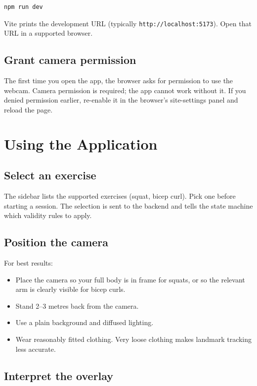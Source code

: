 \documentclass{article}
\begin{document}
\begin{verbatim}
npm run dev
\end{verbatim}

Vite prints the development URL (typically
\texttt{http://localhost:5173}). Open that URL in a supported browser.

\subsection{Grant camera permission}

The first time you open the app, the browser asks for permission to
use the webcam. Camera permission is required; the app cannot work
without it. If you denied permission earlier, re-enable it in the
browser's site-settings panel and reload the page.

\section{Using the Application}

\subsection{Select an exercise}

The sidebar lists the supported exercises (squat, bicep curl). Pick
one before starting a session. The selection is sent to the backend
and tells the state machine which validity rules to apply.

\subsection{Position the camera}

For best results:

\begin{itemize}
  \item Place the camera so your full body is in frame for squats, or
    so the relevant arm is clearly visible for bicep curls.
  \item Stand 2--3 metres back from the camera.
  \item Use a plain background and diffused lighting.
  \item Wear reasonably fitted clothing. Very loose clothing makes
    landmark tracking less accurate.
\end{itemize}

\subsection{Interpret the overlay}
\end{document}
